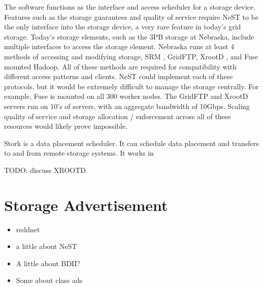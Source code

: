 The software functions as the interface and access scheduler for a storage device.  Features such as the storage guarantees and quality of service require NeST to be the only interface into the storage device, a very rare feature in today's grid storage.  Today's storage elements, such as the 3PB storage at Nebraska, include multiple interfaces to access the storage element.  Nebraska runs at least 4 \cite{attebury2009hadoop} methods of accessing and modifying storage, SRM \cite{shoshani2002storage}, GridFTP, XrootD \cite{dorigo2005xrootd}, and Fuse \cite{szeredi2010fuse} mounted Hadoop.  All of these methods are required for compatibility with different access patterns and clients.  NeST could implement each of these protocols, but it would be extremely difficult to manage the storage centrally.  For example, Fuse is mounted on all 300 worker nodes.  The GridFTP and XrootD servers run on 10's of servers, with an aggregate bandwidth of 10Gbps.  Scaling quality of service and storage allocation / enforcement across all of these resources would likely prove impossible.

Stork \cite{kosar2004stork} is a data placement scheduler.  It can schedule data placement and transfers to and from remote storage systems.  It works in

TODO: discuss XROOTD



\section{Storage Advertisement}

\begin{itemize}
\item reddnet
\item a little about NeST
\item A little about BDII?
\item Some about class ads
\end{itemize}




